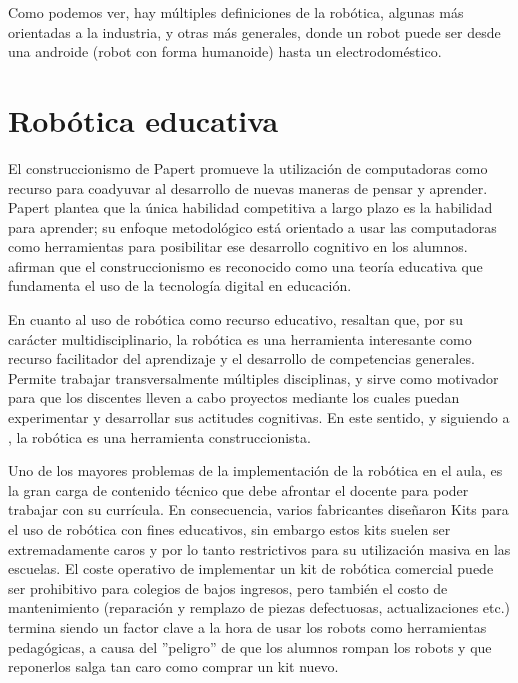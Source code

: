 Como podemos ver, hay múltiples definiciones de la robótica, algunas más orientadas a la industria, y otras más generales, donde un robot puede ser desde una androide (robot con forma humanoide) hasta un electrodoméstico. 


\section{Robótica educativa}
El construccionismo de Papert promueve la utilización de computadoras como recurso para coadyuvar al desarrollo de nuevas maneras de pensar y aprender. Papert plantea que la única habilidad competitiva a largo plazo es la habilidad para aprender; su enfoque metodológico está orientado a usar las computadoras como herramientas para posibilitar ese desarrollo cognitivo en los alumnos. \citet{sanchez_robotica_2012} afirman que el construccionismo es reconocido como una teoría educativa que fundamenta el uso de la tecnología digital en educación.

En cuanto al uso de robótica como recurso educativo, \citet{sanchez_robotica_2012} resaltan que, por su carácter multidisciplinario, la robótica es una herramienta interesante como recurso facilitador del aprendizaje y el desarrollo de competencias generales. Permite trabajar transversalmente múltiples disciplinas, y sirve como motivador para que los discentes lleven a cabo proyectos mediante los cuales puedan experimentar y desarrollar sus actitudes cognitivas. En este sentido, y siguiendo a \citet{pitti_experiencias_2010}, la robótica es una herramienta construccionista. 
 
Uno de los mayores problemas de la implementación de la robótica en el aula, es la gran carga de contenido técnico que debe afrontar el docente para poder trabajar con su currícula. En consecuencia, varios fabricantes diseñaron Kits para el uso de robótica con fines educativos, sin embargo estos kits suelen ser extremadamente caros y por lo tanto restrictivos para su utilización masiva en las escuelas. El coste operativo de implementar un kit de robótica comercial puede ser prohibitivo para colegios de bajos ingresos, pero también el costo de mantenimiento (reparación y remplazo de piezas defectuosas, actualizaciones etc.) termina siendo un factor clave a la hora de usar los robots como herramientas pedagógicas, a causa del ''peligro'' de que los alumnos rompan los robots y que reponerlos salga tan caro como comprar un kit nuevo.

